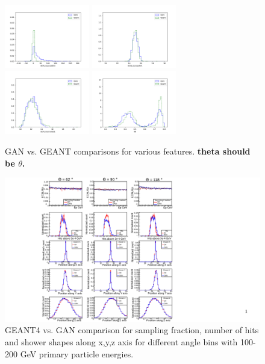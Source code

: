 \begin{figure}
    \includegraphics[width=0.33\textwidth]{Images/Calo/GAN_feature_ECALmomentX3.png}
    \includegraphics[width=0.33\textwidth]{Images/Calo/GAN_feature_ECALmomentY1.png}
    \includegraphics[width=0.33\textwidth]{Images/Calo/GAN_feature_ECALmomentZ1.png}
    \includegraphics[width=0.33\textwidth]{Images/Calo/GAN_feature_R9.png}
    \caption{GAN vs. GEANT comparisons for various features. {\bf theta should be $\theta$.}
    \label{fig:GAN_features}}
\end{figure}
\fi
\begin{figure}
    \centering
    \includegraphics[width=\textwidth, trim={4cm 0cm 9cm 0cm}, clip=true]{Images/Calo/features_1_rev.pdf}
    \caption{GEANT4 vs. GAN comparison for sampling fraction, number
      of hits and shower shapes along x,y,z axis for different angle
      bins with 100-200 GeV primary particle energies.
      \label{fig:GAN_features1}}
\end{figure}

